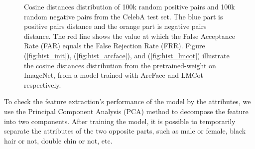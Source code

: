 \begin{figure}
    \caption{Cosine distances distribution of 100k random positive pairs and 100k random negative pairs from the CelebA test set. The blue part is positive pairs distance and the orange part is negative pairs distance. The red line shows the value at which the False Acceptance Rate (FAR) equals the False Rejection Rate (FRR). Figure (\ref{fig:hist_init}), (\ref{fig:hist_arcface}), and (\ref{fig:hist_lmcot}) illustrate the cosine distances distribution from the pretrained-weight on ImageNet, from a model trained with ArcFace and LMCot respectively.}
    \label{figure03}
\end{figure}

To check the feature extraction's performance of the model by the attributes, we use the Principal Component Analysis \cite{wold1987principal} (PCA) method to decompose the feature into two components. After training the model, it is possible to temporarily separate the attributes of the two opposite parts, such as male or female, black hair or not, double chin or not, etc.
